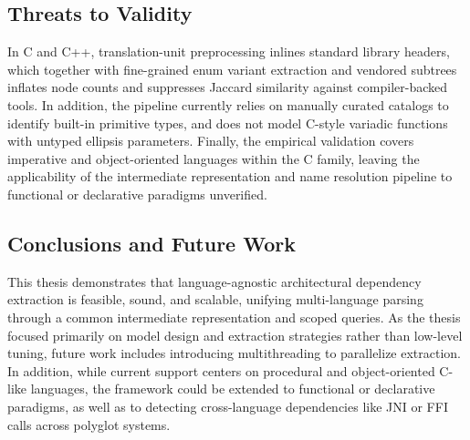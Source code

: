 \documentclass[a4paper, 11pt]{article}
\begin{document}
\subsection{Threats to Validity}
In C and C++, translation-unit preprocessing inlines standard library headers,
which together with fine-grained enum variant extraction and vendored subtrees
inflates node counts and suppresses Jaccard similarity against compiler-backed
tools. In addition, the pipeline currently relies on manually curated catalogs
to identify built-in primitive types, and does not model C-style variadic
functions with untyped ellipsis parameters. Finally, the empirical validation
covers imperative and object-oriented languages within the C family, leaving
the applicability of the intermediate representation and name resolution
pipeline to functional or declarative paradigms unverified.

\subsection{Conclusions and Future Work}
This thesis demonstrates that language-agnostic architectural
dependency extraction is feasible, sound, and scalable, unifying
multi-language parsing through a common intermediate representation
and scoped queries.
As the thesis focused primarily on model design and extraction
strategies rather than low-level tuning, future work includes
introducing multithreading to parallelize extraction. In addition,
while current support centers on procedural and object-oriented
C-like languages, the framework could be extended to functional or
declarative paradigms, as well as to detecting cross-language
dependencies like JNI or FFI calls across polyglot systems.

\printbibliography[title={References}]
\end{document}
